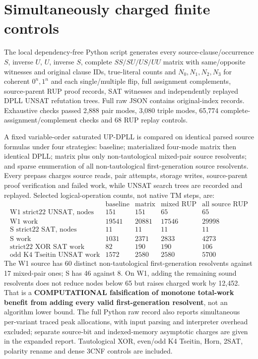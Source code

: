 \documentclass[11pt]{article}
\begin{document}
\section{Simultaneously charged finite controls}
The local dependency-free Python script generates every source-clause/occurrence $S$, inverse $U$, $U$, inverse $S$, complete $SS/SU/US/UU$ matrix with same/opposite witnesses and original clause IDs, true-literal counts and $N_0,N_1,N_2,N_3$ for coherent $0^n,1^n$ and each single/multiple flip, full assignment complements, source-parent RUP proof records, SAT witnesses and independently replayed DPLL UNSAT refutation trees. Full raw JSON contains original-index records. Exhaustive checks passed 2,888 pair modes, 3,080 triple modes, 65,774 complete-assignment/complement checks and 68 RUP replay controls.

A fixed variable-order saturated UP-DPLL is compared on identical parsed source formulas under four strategies: baseline; materialized four-mode matrix then identical DPLL; matrix plus only non-tautological mixed-pair source resolvents; and sparse enumeration of all non-tautological first-generation source resolvents. Every prepass charges source reads, pair attempts, storage writes, source-parent proof verification and failed work, while UNSAT search trees are recorded and replayed. Selected logical-operation counts, not native TM steps, are:
\[
\begin{array}{lrrrr}
&\text{baseline}&\text{matrix}&\text{mixed RUP}&\text{all source RUP}\\
\text{W1 strict22 UNSAT, nodes}&151&151&65&65\\
\text{W1 work}&19541&20881&17546&29998\\
\text{S strict22 SAT, nodes}&11&11&11&11\\
\text{S work}&1031&2371&2833&4273\\
\text{strict22 XOR SAT work}&82&190&190&106\\
\text{odd K4 Tseitin UNSAT work}&1572&2580&2580&5700
\end{array}
\]
The W1 source has 60 distinct non-tautological first-generation resolvents against 17 mixed-pair ones; S has 46 against 8. On W1, adding the remaining sound resolvents does not reduce nodes below 65 but raises charged work by 12,452. That is a \textbf{COMPUTATIONAL falsification of monotone total-work benefit from adding every valid first-generation resolvent}, not an algorithm lower bound. The full Python raw record also reports simultaneous per-variant traced peak allocations, with input parsing and interpreter overhead excluded; separate source-bit and indexed-memory asymptotic charges are given in the expanded report. Tautological XOR, even/odd K4 Tseitin, Horn, 2SAT, polarity rename and dense 3CNF controls are included.
\end{document}
